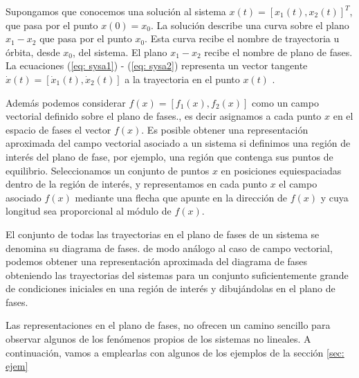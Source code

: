 Supongamos que conocemos una solución al sistema $x(t) = [x_1(t),x_2(t)]^T$, que pasa por el punto $x(0) = x_0$. La solución describe una curva sobre el plano $x_1-x_2$ que pasa por el punto $x_0$. Esta curva recibe el nombre de trayectoria u órbita, desde $x_0$, del sistema. El plano $x_1-x_2$ recibe el nombre de plano de fases. La ecuaciones (\ref{eq: sysa1}) - (\ref{eq: sysa2}) representa un vector tangente $\dot x(t) = [\dot x_1(t),\dot x_2(t)]$ a la trayectoria en el punto $x(t)$ .

Además podemos considerar $f(x)=[f_1(x),f_2(x)]$ como un campo vectorial definido sobre el plano de fases., es decir asignamos a cada punto $x$ en el espacio de fases el vector $f(x)$. Es posible obtener una representación aproximada del campo vectorial asociado a un sistema si definimos una región de interés del plano de fase, por ejemplo, una región que contenga sus puntos de equilibrio. Seleccionamos un conjunto de puntos $x$ en posiciones equiespaciadas dentro de la región de interés, y representamos en cada punto $x$ el campo asociado $f(x)$ mediante una flecha que apunte en la dirección de $f(x)$ y cuya longitud sea proporcional al módulo de $f(x)$.

El conjunto de todas las trayectorias en el plano de fases de un sistema se denomina su diagrama de fases. de modo análogo al caso de campo vectorial, podemos obtener una representación aproximada del diagrama de fases obteniendo las trayectorias del sistemas para un conjunto suficientemente grande de condiciones iniciales en una región de interés y dibujándolas en el plano de fases.

Las representaciones en el plano de fases, no ofrecen un camino sencillo para observar algunos de los fenómenos propios de los sistemas no lineales. A continuación, vamos a emplearlas con algunos de los ejemplos de la sección \ref{sec: ejem}

